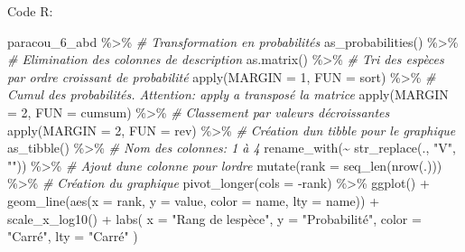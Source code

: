 \documentclass[
  11pt,
  american,
  a4paper,
  extrafontsizes,onecolumn,openright
  ]{memoir}
\newenvironment{Shaded}{\begin{snugshade}}{\end{snugshade}}
\newcommand{\AttributeTok}[1]{\textcolor[rgb]{0.77,0.63,0.00}{#1}}
\newcommand{\CommentTok}[1]{\textcolor[rgb]{0.56,0.35,0.01}{\textit{#1}}}
\newcommand{\DecValTok}[1]{\textcolor[rgb]{0.00,0.00,0.81}{#1}}
\newcommand{\FunctionTok}[1]{\textcolor[rgb]{0.00,0.00,0.00}{#1}}
\newcommand{\NormalTok}[1]{#1}
\newcommand{\SpecialCharTok}[1]{\textcolor[rgb]{0.00,0.00,0.00}{#1}}
\newcommand{\StringTok}[1]{\textcolor[rgb]{0.31,0.60,0.02}{#1}}
\begin{document}
\normalsize

Code R:

\scriptsize

\begin{Shaded}
\begin{Highlighting}[]
\NormalTok{paracou\_6\_abd }\SpecialCharTok{\%\textgreater{}\%}
  \CommentTok{\# Transformation en probabilités}
  \FunctionTok{as\_probabilities}\NormalTok{() }\SpecialCharTok{\%\textgreater{}\%}
  \CommentTok{\# Elimination des colonnes de description}
  \FunctionTok{as.matrix}\NormalTok{() }\SpecialCharTok{\%\textgreater{}\%} 
  \CommentTok{\# Tri des espèces par ordre croissant de probabilité}
  \FunctionTok{apply}\NormalTok{(}\AttributeTok{MARGIN =} \DecValTok{1}\NormalTok{, }\AttributeTok{FUN =}\NormalTok{ sort) }\SpecialCharTok{\%\textgreater{}\%} 
  \CommentTok{\# Cumul des probabilités. Attention: apply a transposé la matrice}
  \FunctionTok{apply}\NormalTok{(}\AttributeTok{MARGIN =} \DecValTok{2}\NormalTok{, }\AttributeTok{FUN =}\NormalTok{ cumsum) }\SpecialCharTok{\%\textgreater{}\%} 
  \CommentTok{\# Classement par valeurs décroissantes}
  \FunctionTok{apply}\NormalTok{(}\AttributeTok{MARGIN =} \DecValTok{2}\NormalTok{, }\AttributeTok{FUN =}\NormalTok{ rev) }\SpecialCharTok{\%\textgreater{}\%} 
  \CommentTok{\# Création d\textquotesingle{}un tibble pour le graphique}
  \FunctionTok{as\_tibble}\NormalTok{() }\SpecialCharTok{\%\textgreater{}\%} 
  \CommentTok{\# Nom des colonnes: 1 à 4}
  \FunctionTok{rename\_with}\NormalTok{(}\SpecialCharTok{\textasciitilde{}} \FunctionTok{str\_replace}\NormalTok{(., }\StringTok{"V"}\NormalTok{, }\StringTok{""}\NormalTok{)) }\SpecialCharTok{\%\textgreater{}\%} 
  \CommentTok{\# Ajout d\textquotesingle{}une colonne pour l\textquotesingle{}ordre}
  \FunctionTok{mutate}\NormalTok{(}\AttributeTok{rank =} \FunctionTok{seq\_len}\NormalTok{(}\FunctionTok{nrow}\NormalTok{(.))) }\SpecialCharTok{\%\textgreater{}\%} 
  \CommentTok{\# Création du graphique}
  \FunctionTok{pivot\_longer}\NormalTok{(}\AttributeTok{cols =} \SpecialCharTok{{-}}\NormalTok{rank) }\SpecialCharTok{\%\textgreater{}\%} 
  \FunctionTok{ggplot}\NormalTok{() }\SpecialCharTok{+}
    \FunctionTok{geom\_line}\NormalTok{(}\FunctionTok{aes}\NormalTok{(}\AttributeTok{x =}\NormalTok{ rank, }\AttributeTok{y =}\NormalTok{ value, }\AttributeTok{color =}\NormalTok{ name, }\AttributeTok{lty =}\NormalTok{ name)) }\SpecialCharTok{+}
    \FunctionTok{scale\_x\_log10}\NormalTok{() }\SpecialCharTok{+}
    \FunctionTok{labs}\NormalTok{(}
      \AttributeTok{x =} \StringTok{"Rang de l\textquotesingle{}espèce"}\NormalTok{, }
      \AttributeTok{y =} \StringTok{"Probabilité"}\NormalTok{, }
      \AttributeTok{color =} \StringTok{"Carré"}\NormalTok{,}
      \AttributeTok{lty =} \StringTok{"Carré"}
\NormalTok{    ) }
\end{Highlighting}
\end{Shaded}
\end{document}
